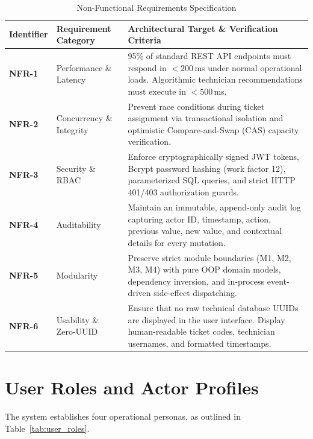 \documentclass[11pt,a4paper,oneside]{report}
\begin{document}
\begin{table}[H]
\centering
\small
\caption{Non-Functional Requirements Specification}
\label{tab:nfr_specs}
\begin{tabular}{p{2.2cm}p{4.0cm}p{8.5cm}}
\toprule
\textbf{Identifier} & \textbf{Requirement Category} & \textbf{Architectural Target \& Verification Criteria} \\
\midrule
\textbf{NFR-1} & Performance \& Latency & 95\% of standard REST API endpoints must respond in $< 200$\,ms under normal operational loads. Algorithmic technician recommendations must execute in $< 500$\,ms. \\
\addlinespace
\textbf{NFR-2} & Concurrency \& Integrity & Prevent race conditions during ticket assignment via transactional isolation and optimistic Compare-and-Swap (CAS) capacity verification. \\
\addlinespace
\textbf{NFR-3} & Security \& RBAC & Enforce cryptographically signed JWT tokens, Bcrypt password hashing (work factor 12), parameterized SQL queries, and strict HTTP 401/403 authorization guards. \\
\addlinespace
\textbf{NFR-4} & Auditability & Maintain an immutable, append-only audit log capturing actor ID, timestamp, action, previous value, new value, and contextual details for every mutation. \\
\addlinespace
\textbf{NFR-5} & Modularity & Preserve strict module boundaries (M1, M2, M3, M4) with pure OOP domain models, dependency inversion, and in-process event-driven side-effect dispatching. \\
\addlinespace
\textbf{NFR-6} & Usability \& Zero-UUID & Ensure that no raw technical database UUIDs are displayed in the user interface. Display human-readable ticket codes, technician usernames, and formatted timestamps. \\
\bottomrule
\end{tabular}
\end{table}

\section{User Roles and Actor Profiles}
\label{sec:req_roles}
The system establishes four operational personas, as outlined in Table~\ref{tab:user_roles}.
\end{document}
